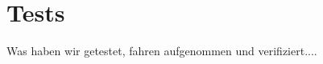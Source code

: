 \chapter{Tests}
\label{sec:test}

Was haben wir getestet, fahren aufgenommen und verifiziert....

  

 
 
 
 
 
 
 
 